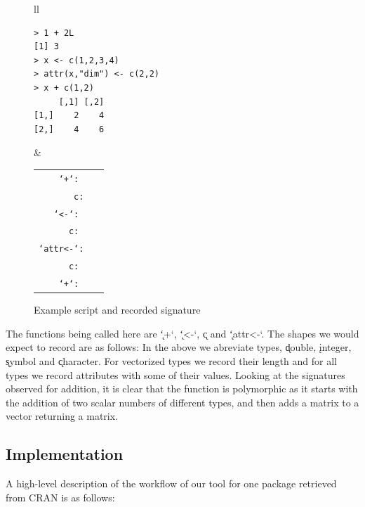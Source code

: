 \documentclass[acmsmall,10pt,review,anonymous]{acmart}\settopmatter{printfolios=true,printccs=false,printacmref=false}
\begin{document}
\begin{figure}[!hb]
\begin{tabular}{ll}\begin{minipage}{5cm}
{\small\begin{lstlisting}[style=R]
> 1 + 2L
[1] 3
> x <- c(1,2,3,4)
> attr(x,"dim") <- c(2,2)
> x + c(1,2)
     [,1] [,2]
[1,]    2    4
[2,]    4    6
\end{lstlisting}}
\end{minipage} &
\begin{minipage}{8cm}\small
\begin{tabular}{rl}
\tt `+`: &\tt \sD \sI \to \sD \\
\tt c:& \sD \sD \sD \sD \to \D\\
\tt `<-`: &\tt \sY \D \to \D\\
\tt c: & \tt \sD \sD \to \D\\
\tt `attr<-`:&\tt  \sY \C \D \to \\
\tt c: &\tt \sD \sD \to \D\\
\tt `+`: &\tt \attr\D{dim=\D} \D \to \attr\D{dim=\D}
\end{tabular}
\end{minipage}
\end{tabular}
\caption{Example script and recorded signature}\label{example}\end{figure}

The functions being called here are \k{`+`}, \k{`<-`}, \k{c} and
\k{`attr<-`}.  The shapes we would expect to record are as follows:
In the above we abreviate types, \k{double}, \k{integer}, \k{symbol} and
\k{character}. For vectorized types we record their length and for all types
we record attributes with some of their values. Looking at the signatures
observed for addition, it is clear that the function is polymorphic as it
starts with the addition of two scalar numbers of different types, and then
adds a matrix to a vector returning a matrix.

\subsection{Implementation}

A high-level description of the workflow of our tool for one package
retrieved from CRAN is as follows:
\end{document}
